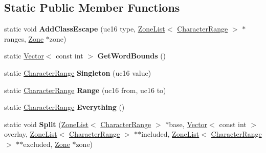 \subsection*{Static Public Member Functions}
\begin{DoxyCompactItemize}
\item 
\hypertarget{classv8_1_1internal_1_1_character_range_af235025c780c569dddf7d9213ea1751d}{}static void {\bfseries Add\+Class\+Escape} (uc16 type, \hyperlink{classv8_1_1internal_1_1_zone_list}{Zone\+List}$<$ \hyperlink{classv8_1_1internal_1_1_character_range}{Character\+Range} $>$ $\ast$ranges, \hyperlink{classv8_1_1internal_1_1_zone}{Zone} $\ast$zone)\label{classv8_1_1internal_1_1_character_range_af235025c780c569dddf7d9213ea1751d}

\item 
\hypertarget{classv8_1_1internal_1_1_character_range_a6bfe19b63871347a50b077122d9dc8c2}{}static \hyperlink{classv8_1_1internal_1_1_vector}{Vector}$<$ const int $>$ {\bfseries Get\+Word\+Bounds} ()\label{classv8_1_1internal_1_1_character_range_a6bfe19b63871347a50b077122d9dc8c2}

\item 
\hypertarget{classv8_1_1internal_1_1_character_range_a83e5e285f0b0f095b8d43a1259e7cb2f}{}static \hyperlink{classv8_1_1internal_1_1_character_range}{Character\+Range} {\bfseries Singleton} (uc16 value)\label{classv8_1_1internal_1_1_character_range_a83e5e285f0b0f095b8d43a1259e7cb2f}

\item 
\hypertarget{classv8_1_1internal_1_1_character_range_a0e8db916f35bc040f15e5dee8f7f1f12}{}static \hyperlink{classv8_1_1internal_1_1_character_range}{Character\+Range} {\bfseries Range} (uc16 from, uc16 to)\label{classv8_1_1internal_1_1_character_range_a0e8db916f35bc040f15e5dee8f7f1f12}

\item 
\hypertarget{classv8_1_1internal_1_1_character_range_ad9b69fc9e62b3eaae9d56d57ffe1ed08}{}static \hyperlink{classv8_1_1internal_1_1_character_range}{Character\+Range} {\bfseries Everything} ()\label{classv8_1_1internal_1_1_character_range_ad9b69fc9e62b3eaae9d56d57ffe1ed08}

\item 
\hypertarget{classv8_1_1internal_1_1_character_range_a09ab13826ccb422ba5b4792f2793dc98}{}static void {\bfseries Split} (\hyperlink{classv8_1_1internal_1_1_zone_list}{Zone\+List}$<$ \hyperlink{classv8_1_1internal_1_1_character_range}{Character\+Range} $>$ $\ast$base, \hyperlink{classv8_1_1internal_1_1_vector}{Vector}$<$ const int $>$ overlay, \hyperlink{classv8_1_1internal_1_1_zone_list}{Zone\+List}$<$ \hyperlink{classv8_1_1internal_1_1_character_range}{Character\+Range} $>$ $\ast$$\ast$included, \hyperlink{classv8_1_1internal_1_1_zone_list}{Zone\+List}$<$ \hyperlink{classv8_1_1internal_1_1_character_range}{Character\+Range} $>$ $\ast$$\ast$excluded, \hyperlink{classv8_1_1internal_1_1_zone}{Zone} $\ast$zone)\label{classv8_1_1internal_1_1_character_range_a09ab13826ccb422ba5b4792f2793dc98}


\end{DoxyCompactItemize}
